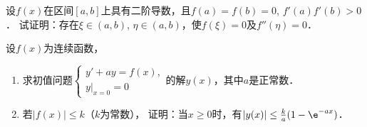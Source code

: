 \documentclass[plain,noanswer,medmath]{../../template/jnuexam}
\begin{document}

\begin{problem}
设$f(x)$在区间$[a,b]$上具有二阶导数，且$f(a) = f(b) = 0$, $f'(a)f'(b) > 0$．
试证明：存在$\xi \in(a,b)$, $\eta \in(a,b)$，使$f(\xi) = 0$及$f''(\eta) = 0$．
\end{problem}



\begin{problem}
设$f(x)$为连续函数，
\begin{enumerate}
\item 求初值问题$\begin{cases}
  y' + ay = f(x), \\
  y|_{x = 0} = 0
\end{cases}$的解$y(x)$，其中$a$是正常数．
\item 若$\left| f(x) \right| \le k$（$k$为常数），
证明：当$x \ge 0$时，有$\left| y(x) \right| \le \frac{k}{a}(1 - \e^{- ax})$．
\end{enumerate}
\end{problem}
\end{document}
